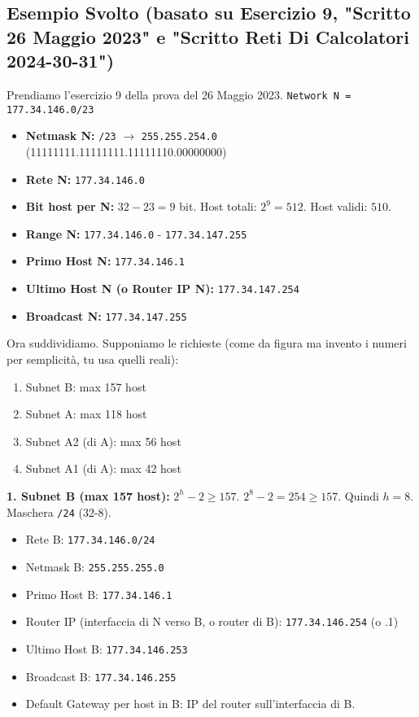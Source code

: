 \subsection{Esempio Svolto (basato su Esercizio 9, "Scritto 26 Maggio 2023" e "Scritto Reti Di Calcolatori 2024-30-31")}
Prendiamo l'esercizio 9 della prova del 26 Maggio 2023.
\texttt{Network N = 177.34.146.0/23}
\begin{itemize}
    \item \textbf{Netmask N:} \texttt{/23} $\to$ \texttt{255.255.254.0} (11111111.11111111.11111110.00000000)
    \item \textbf{Rete N:} \texttt{177.34.146.0}
    \item \textbf{Bit host per N:} $32 - 23 = 9$ bit. Host totali: $2^9 = 512$. Host validi: $510$.
    \item \textbf{Range N:} \texttt{177.34.146.0} - \texttt{177.34.147.255}
    \item \textbf{Primo Host N:} \texttt{177.34.146.1}
    \item \textbf{Ultimo Host N (o Router IP N):} \texttt{177.34.147.254}
    \item \textbf{Broadcast N:} \texttt{177.34.147.255}
\end{itemize}

Ora suddividiamo. Supponiamo le richieste (come da figura ma invento i numeri per semplicità, tu usa quelli reali):
\begin{enumerate}[label=\arabic*.]
    \item Subnet B: max 157 host
    \item Subnet A: max 118 host
    \item Subnet A2 (di A): max 56 host
    \item Subnet A1 (di A): max 42 host
\end{enumerate}

\textbf{1. Subnet B (max 157 host):}
$2^h - 2 \ge 157$. $2^8 - 2 = 254 \ge 157$. Quindi $h=8$. Maschera \texttt{/24} (32-8).
\begin{itemize}
    \item Rete B: \texttt{177.34.146.0/24}
    \item Netmask B: \texttt{255.255.255.0}
    \item Primo Host B: \texttt{177.34.146.1}
    \item Router IP (interfaccia di N verso B, o router di B): \texttt{177.34.146.254} (o .1)
    \item Ultimo Host B: \texttt{177.34.146.253}
    \item Broadcast B: \texttt{177.34.146.255}
    \item Default Gateway per host in B: IP del router sull'interfaccia di B.
\end{itemize}

